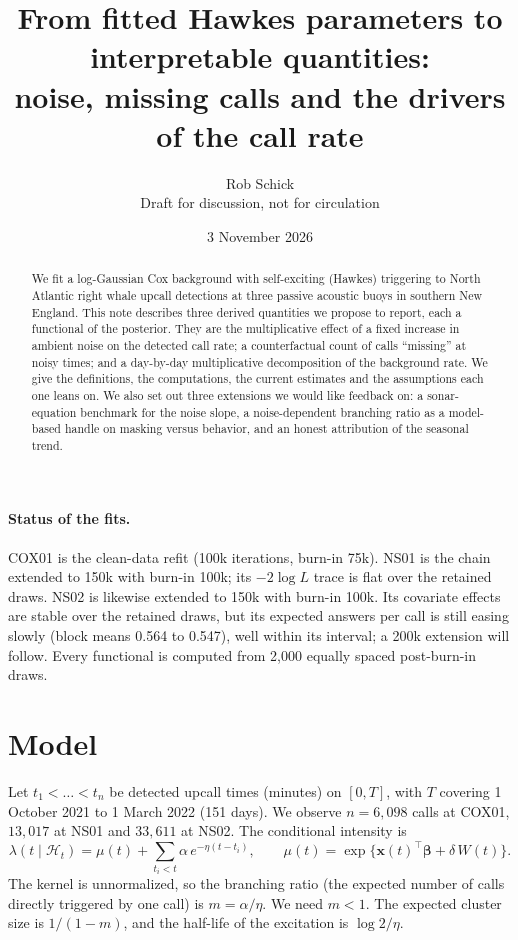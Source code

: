 \documentclass[11pt]{article}
\title{From fitted Hawkes parameters to interpretable quantities:\\
noise, missing calls and the drivers of the call rate}
\author{Rob Schick\\[2pt]\small Draft for discussion, not for circulation}
\date{3 November 2026}
\newcommand{\bx}{\bm{x}}
\newcommand{\bb}{\bm{\beta}}
\begin{document}
\maketitle

\begin{abstract}
\noindent
We fit a log-Gaussian Cox background with self-exciting (Hawkes) triggering to
North Atlantic right whale upcall detections at three passive acoustic buoys
in southern New England. This note describes three derived quantities we
propose to report, each a functional of the posterior. They are the
multiplicative effect of a fixed increase in ambient noise on the detected
call rate; a counterfactual count of calls ``missing'' at noisy times; and a
day-by-day multiplicative decomposition of the background rate. We give the
definitions, the computations, the current estimates and the assumptions each
one leans on. We also set out three extensions we would like feedback on: a
sonar-equation benchmark for the noise slope, a noise-dependent branching
ratio as a model-based handle on masking versus behavior, and an honest
attribution of the seasonal trend.
\end{abstract}

\paragraph{Status of the fits.}
COX01 is the clean-data refit (100k iterations, burn-in 75k). NS01 is the
chain extended to 150k with burn-in 100k; its $-2\log L$ trace is flat over
the retained draws. NS02 is likewise extended to 150k with burn-in 100k. Its
covariate effects are stable over the retained draws, but its expected answers
per call is still easing slowly (block means 0.564 to 0.547), well within its
interval; a 200k extension will follow. Every functional is computed from 2{,}000 equally spaced
post-burn-in draws.

\section{Model}\label{sec:model}

Let $t_1<\dots<t_n$ be detected upcall times (minutes) on $[0,T]$, with $T$
covering 1 October 2021 to 1 March 2022 (151 days). We observe $n=6{,}098$
calls at COX01, $13{,}017$ at NS01 and $33{,}611$ at NS02. The conditional
intensity is
\begin{equation}\label{eq:lambda}
\lambda(t\mid\mathcal{H}_t)=\mu(t)+\sum_{t_i<t}\alpha\,e^{-\eta(t-t_i)},
\qquad
\mu(t)=\exp\{\bx(t)^\top\bb+\delta\,W(t)\}.
\end{equation}
The kernel is unnormalized, so the branching ratio (the expected number of
calls directly triggered by one call) is $m=\alpha/\eta$. We need $m<1$. The
expected cluster size is $1/(1-m)$, and the half-life of the excitation is
$\log 2/\eta$.
\end{document}
